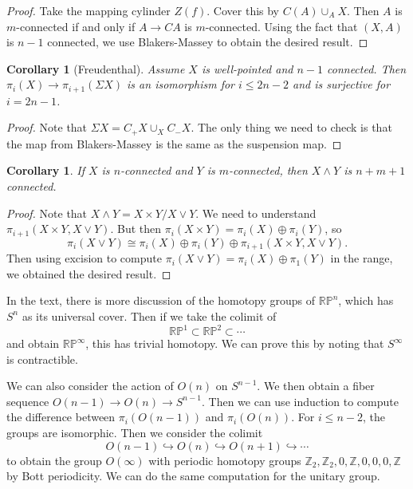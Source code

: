 \documentclass[leqno, openany]{memoir}
\newtheorem{cor}[thm]{Corollary}
\theoremstyle{definition}
\theoremstyle{remark}
\theoremstyle{plain}
\theoremstyle{definition}
\theoremstyle{remark}
\newcommand{\R}{\mathbb{R}}
\newcommand{\Z}{\mathbb{Z}}
\renewcommand{\P}{\mathbb{P}}
\begin{document}
\begin{proof}
    Take the mapping cylinder $Z(f)$. Cover this by $C(A) \cup_A X$. Then $A$ is $m$-connected if and only if $A \to CA$ is $m$-connected. Using the fact that $(X,A)$ is $n-1$ connected, we use Blakers-Massey to obtain the desired result.
\end{proof}

\begin{cor}[Freudenthal]
    Assume $X$ is well-pointed and $n-1$ connected. Then $\pi_i(X) \to \pi_{i+1}(\Sigma X)$ is an isomorphism for $i \leq 2n-2$ and is surjective for $i = 2n-1$.
\end{cor}

\begin{proof}
    Note that $\Sigma X = C_+X \cup_X C_-X$. The only thing we need to check is that the map from Blakers-Massey is the same as the suspension map.
\end{proof}

\begin{cor}
    If $X$ is $n$-connected and $Y$ is $m$-connected, then $X \wedge Y$ is $n+m+1$ connected.
\end{cor}

\begin{proof}
    Note that $X \wedge Y = X \times Y / X \vee Y$. We need to understand $\pi_{i+1}(X \times Y, X \vee Y)$. But then $\pi_i(X \times Y) = \pi_i(X) \oplus \pi_i(Y)$, so 
    \[ \pi_i(X \vee Y) \cong \pi_i(X) \oplus \pi_i(Y) \oplus \pi_{i+1}(X \times Y, X \vee Y). \]
    Then using excision to compute $\pi_i(X \vee Y) = \pi_i(X) \oplus \pi_1(Y)$ in the range, we obtained the desired result.
\end{proof}

In the text, there is more discussion of the homotopy groups of $\R\P^n$, which has $S^n$ as its universal cover. Then if we take the colimit of
\[ \R\P^1 \subset \R\P^2 \subset \cdots \]
and obtain $\R\P^{\infty}$, this has trivial homotopy. We can prove this by noting that $S^{\infty}$ is contractible.

We can also consider the action of $O(n)$ on $S^{n-1}$. We then obtain a fiber sequence $O(n-1) \to O(n) \to S^{n-1}$. Then we can use induction to compute the difference between $\pi_i(O(n-1))$ and $\pi_i(O(n))$. For $i \leq n-2$, the groups are isomorphic. Then we consider the colimit
\[ O(n-1) \hookrightarrow O(n) \hookrightarrow O(n+1) \hookrightarrow \cdots \]
to obtain the group $O(\infty)$ with periodic homotopy groups $\Z_2, \Z_2, 0, \Z, 0, 0, 0, \Z$ by Bott periodicity. We can do the same computation for the unitary group.
\end{document}
